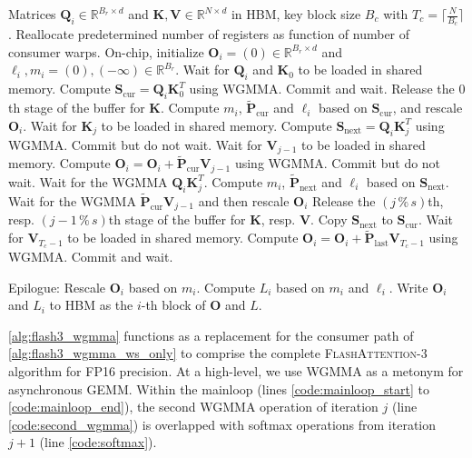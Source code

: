 \documentclass{article}
\newcommand{\RR}{\mathbb{R}}
\newcommand{\vQ}{\mathbf{Q}}
\newcommand{\vK}{\mathbf{K}}
\newcommand{\vV}{\mathbf{V}}
\newcommand{\vS}{\mathbf{S}}
\newcommand{\vP}{\mathbf{P}}
\newcommand{\vO}{\mathbf{O}}
\newcommand{\fat}{\textsc{FlashAttention-3}\xspace}  %
\begin{document}
\begin{algorithm}[H]
    \caption{\small\label{alg:flash3_wgmma}\fat consumer warpgroup forward pass}
    \begin{algorithmic}[1]
      \REQUIRE  Matrices $\vQ_i \in \RR^{B_r \times d}$ and $\vK, \vV \in \mathbb{R}^{N \times d}$ in HBM, key block size $B_c$ with $T_c = \lceil \frac{N}{B_c} \rceil$.
      \STATE Reallocate predetermined number of registers as function of number of consumer warps.
      \STATE On-chip, initialize $\vO_i = (0) \in \mathbb{R}^{B_r \times d}$ and $\ell_i, m_i = (0), (-\infty) \in \mathbb{R}^{B_r}$.
      \STATE Wait for $\vQ_i$ and $\vK_0$ to be loaded in shared memory.
      \STATE Compute $\vS_{\mathrm{cur}} = \vQ_i \vK_0^T$ using WGMMA. Commit and wait.
      \STATE Release the $0$th stage of the buffer for $\vK$.
      \STATE Compute $m_{i}$, $\tilde{\vP}_{\mathrm{cur}}$ and $\ell_{i}$ based on $\vS_{\mathrm{cur}}$, and rescale $\vO_i$.
        \STATE Wait for $\vK_j$ to be loaded in shared memory.
        \label{code:mainloop_start}
        \STATE Compute $\vS_{\mathrm{next}} = \vQ_i \vK_{j}^T$ using WGMMA. Commit but do not wait. \label{code:first_wgmma}
        \STATE Wait for $\vV_{j-1}$ to be loaded in shared memory.
        \STATE Compute $\vO_{i} = \vO_{i} + \tilde{\vP}_{\mathrm{cur}} \vV_{j-1}$ using WGMMA. Commit but do not wait. \label{code:second_wgmma}
        \STATE Wait for the WGMMA $\vQ_i \vK_{j}^T$.
        \STATE Compute $m_{i}$, $\tilde{\vP}_{\mathrm{next}}$ and $\ell_{i}$ based on $\vS_{\mathrm{next}}$. \label{code:softmax}
        \STATE Wait for the WGMMA $\tilde{\vP}_{\mathrm{cur}} \vV_{j-1}$ and then rescale $\vO_i$
        \STATE Release the $(j\,\%\,s)$th, resp. $(j-1\,\%\,s)$th stage of the buffer for $\vK$, resp. $\vV$.
        \STATE Copy $\vS_{\mathrm{next}}$ to $\vS_{\mathrm{cur}}$.
        \label{code:mainloop_end}
      \ENDFOR
      \STATE Wait for $\vV_{T_c - 1}$ to be loaded in shared memory.
      \STATE Compute
      $\vO_{i} = \vO_{i} + \tilde{\vP}_{\mathrm{last}} \vV_{T_c - 1}$ using WGMMA. Commit and wait.

      \STATE Epilogue:
      Rescale $\vO_{i}$ based on $m_{i}$.
      Compute $L_{i}$ based on $m_{i}$ and $\ell_{i}$.
      Write $\vO_{i}$ and $L_{i}$ to HBM as the $i$-th block of $\vO$ and $L$.
    \end{algorithmic}
  \end{algorithm}

  \cref{alg:flash3_wgmma} functions as a replacement for the consumer path of \cref{alg:flash3_wgmma_ws_only} to comprise the complete \fat algorithm for FP16 precision. At a high-level, we use WGMMA as a metonym for asynchronous GEMM. Within the mainloop (lines \ref{code:mainloop_start} to \ref{code:mainloop_end}), the second WGMMA operation of iteration $j$ (line \ref{code:second_wgmma}) is overlapped with softmax operations from iteration $j+1$ (line \ref{code:softmax}).
\end{document}
